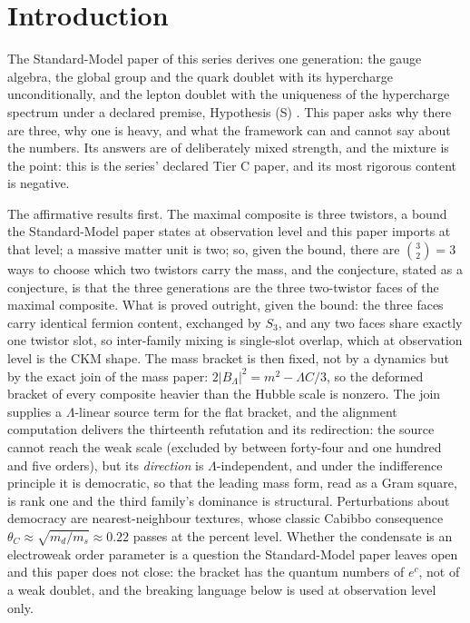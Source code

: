 \documentclass[11pt]{article}
\theoremstyle{definition}
\begin{document}
\newpage
\section{Introduction}\label{sec:intro}

The Standard-Model paper of this series derives one generation: the gauge algebra, the global group and the quark doublet with its hypercharge unconditionally, and the lepton doublet with the uniqueness of the hypercharge spectrum under a declared premise, Hypothesis (S) \cite{ButlerT12}. This paper asks why there are three, why one is heavy, and what the framework can and cannot say about the numbers. Its answers are of deliberately mixed strength, and the mixture is the point: this is the series' declared Tier C paper, and its most rigorous content is negative.

The affirmative results first. The maximal composite is three twistors, a bound the Standard-Model paper states at observation level and this paper imports at that level; a massive matter unit is two; so, given the bound, there are $\binom{3}{2} = 3$ ways to choose which two twistors carry the mass, and the conjecture, stated as a conjecture, is that the three generations are the three two-twistor faces of the maximal composite. What is proved outright, given the bound: the three faces carry identical fermion content, exchanged by $S_{3}$, and any two faces share exactly one twistor slot, so inter-family mixing is single-slot overlap, which at observation level is the CKM shape. The mass bracket is then fixed, not by a dynamics but by the exact join of the mass paper: $2|B_{\Lambda}|^{2} = m^{2} - \Lambda C/3$, so the deformed bracket of every composite heavier than the Hubble scale is nonzero. The join supplies a $\Lambda$-linear source term for the flat bracket, and the alignment computation delivers the thirteenth refutation and its redirection: the source cannot reach the weak scale (excluded by between forty-four and one hundred and five orders), but its \emph{direction} is $\Lambda$-independent, and under the indifference principle it is democratic, so that the leading mass form, read as a Gram square, is rank one and the third family's dominance is structural. Perturbations about democracy are nearest-neighbour textures, whose classic Cabibbo consequence $\theta_{C} \approx \sqrt{m_{d}/m_{s}} \approx 0.22$ passes at the percent level. Whether the condensate is an electroweak order parameter is a question the Standard-Model paper leaves open and this paper does not close: the bracket has the quantum numbers of $e^{c}$, not of a weak doublet, and the breaking language below is used at observation level only.
\end{document}
